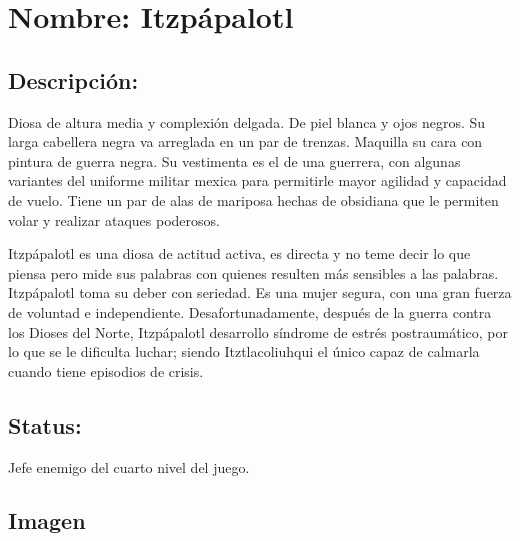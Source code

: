\section{Nombre: Itzpápalotl}  \label{per:itzpapalotl}
\subsection{Descripción:}
Diosa de altura media y complexión delgada. De piel blanca y ojos negros. Su larga cabellera negra va arreglada en un par de trenzas. Maquilla su cara con pintura de guerra negra. Su vestimenta es el de una guerrera, con algunas variantes del uniforme militar mexica para permitirle mayor agilidad y capacidad de vuelo.  Tiene un par de alas de mariposa hechas de obsidiana que le permiten volar y realizar ataques poderosos.    

Itzpápalotl es una diosa de actitud activa, es directa y no teme decir lo que piensa pero mide sus palabras con quienes resulten más sensibles a las palabras. Itzpápalotl toma su deber con seriedad. Es una mujer segura, con una gran fuerza de voluntad e independiente. Desafortunadamente, después de la guerra contra los Dioses del Norte, Itzpápalotl desarrollo síndrome de estrés postraumático, por lo que se le dificulta luchar; siendo Itztlacoliuhqui  el único capaz de calmarla cuando tiene episodios de crisis.
\subsection{Status:}
Jefe enemigo del cuarto nivel del juego.
\subsection{Imagen}
